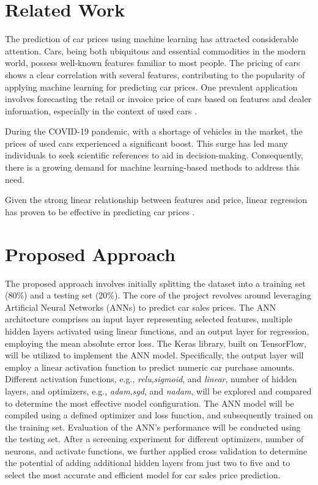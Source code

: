\documentclass[sigplan,screen]{acmart}
\begin{document}
\section{Related Work}
The prediction of car prices using machine learning has attracted considerable attention. Cars, being both ubiquitous and essential commodities in the modern world, possess well-known features familiar to most people. The pricing of cars shows a clear correlation with several features, contributing to the popularity of applying machine learning for predicting car prices. One prevalent application involves forecasting the retail or invoice price of cars based on features and dealer information, especially in the context of used cars \citep{asghar2021used, narayana2022second}.

During the COVID-19 pandemic, with a shortage of vehicles in the market, the prices of used cars experienced a significant boost. This surge has led many individuals to seek scientific references to aid in decision-making. Consequently, there is a growing demand for machine learning-based methods to address this need.

Given the strong linear relationship between features and price, linear regression has proven to be effective in predicting car prices \citep{bukvic2022price, sumeyra2023using}.

\section{Proposed Approach} 

The proposed approach involves initially splitting the dataset into a training set (80\%) and a testing set (20\%). The core of the project revolves around leveraging Artificial Neural Networks (ANNs) to predict car sales prices. The ANN architecture comprises an input layer representing selected features, multiple hidden layers activated using linear functions, and an output layer for regression, employing the mean absolute error loss. The Keras library, built on TensorFlow, will be utilized to implement the ANN model. Specifically, the output layer will employ a linear activation function to predict numeric car purchase amounts. Different activation functions, e.g., {\it relu},{\it sigmoid}, and {\it linear}, number of hidden layers, and optimizers, e.g., {\it adam},{\it sgd}, and {\it nadam}, will be explored and compared to determine the most effective model configuration. The ANN model will be compiled using a defined optimizer and loss function, and subsequently trained on the training set. Evaluation of the ANN's performance will be conducted using the testing set. After a screening experiment for different optimizers, number of neurons, and activate functions, we further applied cross validation to determine the potential of adding additional hidden layers from just two to five and to select the most accurate and efficient model for car sales price prediction.
\end{document}
